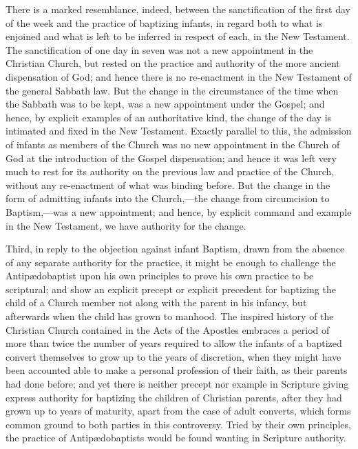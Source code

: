 \documentclass[]{book}
\begin{document}
There is a marked resemblance, indeed, between the sanctification of the first day of the week and the practice of baptizing infants, in regard both to what is enjoined and what is left to be inferred in respect of each, in the New Testament. The sanctification of one day in seven was not a new appointment in the Christian Church, but rested on the practice and authority of the more ancient dispensation of God; and hence there is no re-enactment in the New Testament of the general Sabbath law. But the change in the circumstance of the time when the Sabbath was to be kept, was a new appointment under the Gospel; and hence, by explicit examples of an authoritative kind, the change of the day is intimated and fixed in the New Testament. Exactly parallel to this, the admission of infants as members of the Church was no new appointment in the Church of God at the introduction of the Gospel dispensation; and hence it was left very much to rest for its authority on the previous law and practice of the Church, without any re-enactment of what was binding before. But the change in the form of admitting infants into the Church,---the change from circumcision to Baptism,---was a new appointment; and hence, by explicit command and example in the New Testament, we have authority for the change.

Third, in reply to the objection against infant Baptism, drawn from the absence of any separate authority for the practice, it might be enough to challenge the Antipædobaptist upon his own principles to prove his own practice to be scriptural; and show an explicit precept or explicit precedent for baptizing the child of a Church member not along with the parent in his infancy, but afterwards when the child has grown to manhood. The inspired history of the Christian Church contained in the Acts of the Apostles embraces a period of more than twice the number of years required to allow the infants of a baptized convert themselves to grow up to the years of discretion, when they might have been accounted able to make a personal profession of their faith, as their parents had done before; and yet there is neither precept nor example in Scripture giving express authority for baptizing the children of Christian parents, after they had grown up to years of maturity, apart from the case of adult converts, which forms common ground to both parties in this controversy. Tried by their own principles, the practice of Antipædobaptists would be found wanting in Scripture authority.
\end{document}
